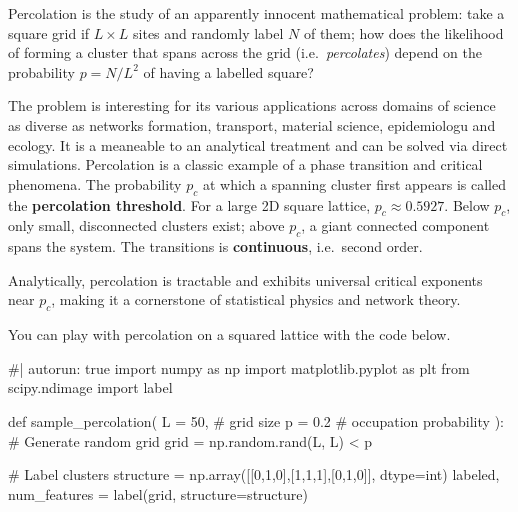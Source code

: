 \documentclass[
  letterpaper,
  enabledeprecatedfontcommands]{report}
\newenvironment{Shaded}{\begin{snugshade}}{\end{snugshade}}
\newcommand{\NormalTok}[1]{\textcolor[rgb]{0.00,0.23,0.31}{#1}}
\begin{document}
\begin{tcolorbox}[enhanced jigsaw, toprule=.15mm, opacityback=0, colbacktitle=quarto-callout-note-color!10!white, title=\textcolor{quarto-callout-note-color}{\faInfo}\hspace{0.5em}{Percolation}, leftrule=.75mm, rightrule=.15mm, bottomtitle=1mm, breakable, colframe=quarto-callout-note-color-frame, colback=white, toptitle=1mm, left=2mm, titlerule=0mm, coltitle=black, arc=.35mm, bottomrule=.15mm, opacitybacktitle=0.6]

Percolation is the study of an apparently innocent mathematical problem:
take a square grid if \(L\times L\) sites and randomly label \(N\) of
them; how does the likelihood of forming a cluster that spans across the
grid (i.e.~\emph{percolates}) depend on the probability \(p=N/L^2\) of
having a labelled square?

The problem is interesting for its various applications across domains
of science as diverse as networks formation, transport, material
science, epidemiologu and ecology. It is a meaneable to an analytical
treatment and can be solved via direct simulations. Percolation is a
classic example of a phase transition and critical phenomena. The
probability \(p_c\) at which a spanning cluster first appears is called
the \textbf{percolation threshold}. For a large 2D square lattice,
\(p_c \approx 0.5927\). Below \(p_c\), only small, disconnected clusters
exist; above \(p_c\), a giant connected component spans the system. The
transitions is \textbf{continuous}, i.e.~second order.

Analytically, percolation is tractable and exhibits universal critical
exponents near \(p_c\), making it a cornerstone of statistical physics
and network theory.

You can play with percolation on a squared lattice with the code below.

\begin{Shaded}
\begin{Highlighting}[]
\NormalTok{\#| autorun: true}
\NormalTok{import numpy as np}
\NormalTok{import matplotlib.pyplot as plt}
\NormalTok{from scipy.ndimage import label}

\NormalTok{def sample\_percolation(}
\NormalTok{    L = 50,  \# grid size}
\NormalTok{    p = 0.2  \# occupation probability}
\NormalTok{):}
\NormalTok{    \# Generate random grid}
\NormalTok{    grid = np.random.rand(L, L) \textless{} p}

\NormalTok{    \# Label clusters}
\NormalTok{    structure = np.array([[0,1,0],[1,1,1],[0,1,0]], dtype=int) }
\NormalTok{    labeled, num\_features = label(grid, structure=structure)}


\end{Highlighting}
\end{Shaded}
\end{tcolorbox}
\end{document}
